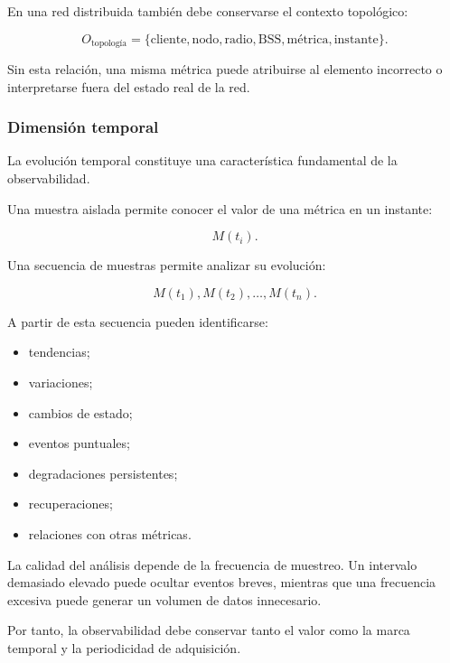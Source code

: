 En una red distribuida también debe conservarse el contexto topológico:

\[
    O_{\mathrm{topología}}
    =
    \{
        \text{cliente},
        \text{nodo},
        \text{radio},
        \text{BSS},
        \text{métrica},
        \text{instante}
    \}.
\]

Sin esta relación, una misma métrica puede atribuirse al elemento
incorrecto o interpretarse fuera del estado real de la red.


\subsubsection*{Dimensión temporal}

La evolución temporal constituye una característica fundamental de la
observabilidad.

Una muestra aislada permite conocer el valor de una métrica en un
instante:

\[
    M(t_i).
\]

Una secuencia de muestras permite analizar su evolución:

\[
    M(t_1),
    M(t_2),
    \ldots,
    M(t_n).
\]

A partir de esta secuencia pueden identificarse:

\begin{itemize}
    \item tendencias;

    \item variaciones;

    \item cambios de estado;

    \item eventos puntuales;

    \item degradaciones persistentes;

    \item recuperaciones;

    \item relaciones con otras métricas.
\end{itemize}

La calidad del análisis depende de la frecuencia de muestreo. Un
intervalo demasiado elevado puede ocultar eventos breves, mientras que
una frecuencia excesiva puede generar un volumen de datos innecesario.

Por tanto, la observabilidad debe conservar tanto el valor como la marca
temporal y la periodicidad de adquisición.


